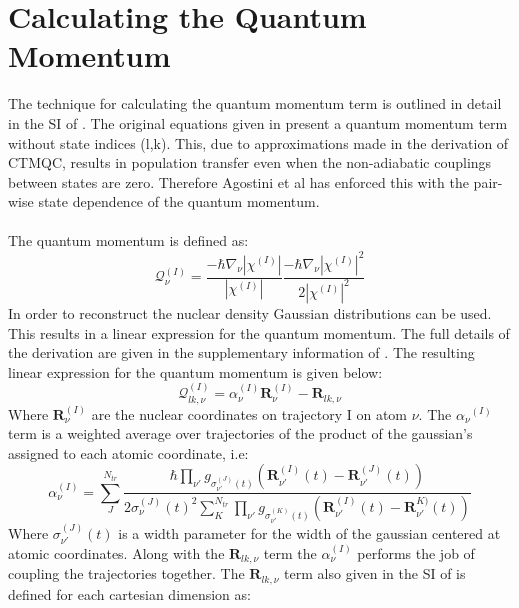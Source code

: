  \section{Calculating the Quantum Momentum \label{sec:calc_QM}}
 The technique for calculating the quantum momentum term is outlined in detail in the SI of \cite{min_ab_2017}. The original equations given in \cite{agostini_quantum-classical_2016} present a quantum momentum term without state indices (l,k). This, due to approximations made in the derivation of CTMQC, results in population transfer even when the non-adiabatic couplings between states are zero. Therefore Agostini et al has enforced this with the pair-wise state dependence of the quantum momentum.
 \\\\
The quantum momentum is defined as:
\begin{equation}
  \mathcal{Q}_{\nu}^{(I)} = \frac{-\hbar \nabla_{\nu} |\chi^{(I)}|}{|\chi^{(I)}|} \frac{-\hbar \nabla_{\nu} |\chi^{(I)}|^2}{2|\chi^{(I)}|^2}
  \label{eq:QM_def}
\end{equation}
In order to reconstruct the nuclear density Gaussian distributions can be used. This results in a linear expression for the quantum momentum.
The full details of the derivation are given in the supplementary information of \cite{min_ab_2017}. The resulting linear expression for the quantum momentum is given below:
\begin{equation}
  \mathcal{Q}_{lk, \nu}^{(I)} = \alpha_{\nu}^{(I)} \textbf{R}_{\nu}^{(I)} - \textbf{R}_{lk, \nu}
  \label{eq:QM_lin}
\end{equation}
Where $\textbf{R}_{\nu}^{(I)}$ are the nuclear coordinates on trajectory I on atom $\nu$. The $\alpha_{\nu}{^(I)}$ term is a weighted average over trajectories of the product of the gaussian's assigned to each atomic coordinate, i.e:
\begin{equation}
  \alpha_{\nu}^{(I)} = \sum_{J}^{N_{tr}} \frac{\hbar \prod_{\nu'} g_{\sigma_{\nu'}^{(J)}(t)}\left(\textbf{R}_{\nu'}^{(I)}(t) - \textbf{R}_{\nu'}^{(J)}(t)\right)}   {2 \sigma_{\nu}^{(J)}(t)^2\sum_{K}^{N_{tr}}\prod_{\nu'} g_{\sigma_{\nu'}^{(K)}(t)}\left(\textbf{R}_{\nu'}^{(I)}(t) - \textbf{R}_{\nu'}^{K)}(t)\right)}
  \label{eq:alpha}
\end{equation}
Where $\sigma_{\nu'}^{(J)}(t)$ is a width parameter for the width of the gaussian centered at atomic coordinates. Along with the $\textbf{R}_{lk, \nu}$ term the $\alpha_{\nu}^{(I)}$ performs the job of coupling the trajectories together. The $\textbf{R}_{lk, \nu}$ term also given in the SI of \cite{min_ab_2017} is defined for each cartesian dimension as:
